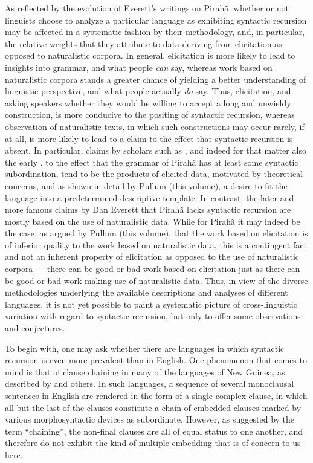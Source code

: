 \documentclass[output=paper,colorlinks,citecolor=brown
]{langscibook}
\begin{document}
As reflected by the evolution of Everett's writings on Pirahã, whether or not linguists choose to analyze a particular language as exhibiting syntactic recursion may be affected in a systematic fashion by their methodology, and, in particular, the relative weights that they attribute to data deriving from elicitation as opposed to naturalistic corpora.  In general, elicitation is more likely to lead to insights into grammar, and what people \emph{can} say, whereas work based on naturalistic corpora stands a greater chance of yielding a better understanding of linguistic perspective, and what people actually \emph{do} say.  Thus, elicitation, and asking speakers whether they would be willing to accept a long and unwieldy construction, is more conducive to the positing of syntactic recursion, whereas observation of naturalistic texts, in which such constructions may occur rarely, if at all, is more likely to lead to a claim to the effect that syntactic recursion is absent.  In particular, claims by scholars such as \citet{sandalo2018selfembedded}, and indeed for that matter also the early \citet{everett1986piraha}, to the effect that the grammar of Pirahã has at least some syntactic subordination, tend to be the products of elicited data, motivated by theoretical concerns, and as shown in detail by Pullum (this volume), a desire to fit the language into a predetermined descriptive template.  In contrast, the later and more famous claims by Dan Everett that Pirahã lacks syntactic recursion are mostly based on the use of naturalistic data.  While for Pirahã it may indeed be the case, as argued by Pullum (this volume), that the work based on elicitation is of inferior quality to the work based on naturalistic data, this is a contingent fact and not an inherent property of elicitation as opposed to the use of naturalistic corpora — there can be good or bad work based on elicitation just as there can be good or bad work making use of naturalistic data.  Thus, in view of the diverse methodologies underlying the available descriptions and analyses of different languages, it is not yet possible to paint a systematic picture of cross-linguistic variation with regard to syntactic recursion, but only to offer some observations and conjectures.

To begin with, one may ask whether there are languages in which syntactic recursion is even more prevalent than in English.  One phenomenon that comes to mind is that of clause chaining in many of the languages of New Guinea, as described by \citet{foley2010clause} and others.  In such languages, a sequence of several monoclausal sentences in English are rendered in the form of a single complex clause, in which all but the last of the clauses constitute a chain of embedded clauses marked by various morphosyntactic devices as subordinate.  However, as suggested by the term ``chaining'', the non-final clauses are all of equal status to one another, and therefore do not exhibit the kind of multiple embedding that is of concern to us here.
\end{document}
